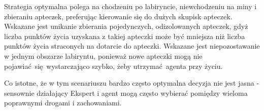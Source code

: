Strategia optymalna polega na chodzeniu po labiryncie, niewchodzeniu na miny i zbieraniu apteczek, preferując kierowanie się do dużych skupisk apteczek. Wskazane jest unikanie zbierania pojedynczych, odizolowanych apteczek, gdyż liczba punktów życia uzyskana z takiej apteczki może być mniejsza niż liczba punktów życia straconych na dotarcie do apteczki. Wskazane jest niepozostawanie w jednym obszarze labiryntu, ponieważ nowe apteczki mogą nie pojawiać się wystarczająco szybko, żeby utrzymać agenta przy życiu.

Co istotne, że w tym scenariuszu bardzo często optymalna decyzja nie jest jasna - sensownie działający Ekspert i agent mogą często wybierać pomiędzy wieloma poprawnymi drogami i zachowaniami.

\begin{figure}[H]
	\begin{floatrow}
	\end{floatrow}
\end{figure}

